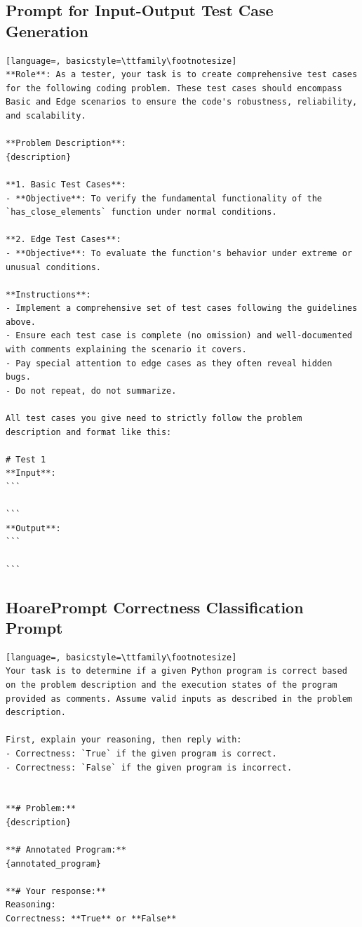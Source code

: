 \documentclass[sigconf]{acmart}
\begin{document}
\subsection{Prompt for Input-Output Test Case Generation}
\begin{tcolorbox}[ colback=gray!10, colframe=black, arc=5pt]
\begin{lstlisting}[language=, basicstyle=\ttfamily\footnotesize]
**Role**: As a tester, your task is to create comprehensive test cases for the following coding problem. These test cases should encompass Basic and Edge scenarios to ensure the code's robustness, reliability, and scalability.

**Problem Description**:  
{description}

**1. Basic Test Cases**:  
- **Objective**: To verify the fundamental functionality of the `has_close_elements` function under normal conditions.

**2. Edge Test Cases**:  
- **Objective**: To evaluate the function's behavior under extreme or unusual conditions.

**Instructions**:  
- Implement a comprehensive set of test cases following the guidelines above.  
- Ensure each test case is complete (no omission) and well-documented with comments explaining the scenario it covers.  
- Pay special attention to edge cases as they often reveal hidden bugs.  
- Do not repeat, do not summarize.  

All test cases you give need to strictly follow the problem description and format like this:

# Test 1  
**Input**:  
```

```
**Output**:  
```

```

\end{lstlisting}
\end{tcolorbox}

\subsection{HoarePrompt Correctness Classification Prompt}
\label{correctness-single-func-prompt}
\begin{tcolorbox}[ colback=gray!10, colframe=black, arc=5pt]
\begin{lstlisting}[language=, basicstyle=\ttfamily\footnotesize]
Your task is to determine if a given Python program is correct based on the problem description and the execution states of the program provided as comments. Assume valid inputs as described in the problem description.

First, explain your reasoning, then reply with:  
- Correctness: `True` if the given program is correct.  
- Correctness: `False` if the given program is incorrect.


**# Problem:**  
{description}

**# Annotated Program:**  
{annotated_program}

**# Your response:**  
Reasoning:  
Correctness: **True** or **False**

\end{lstlisting}
\end{tcolorbox}
\end{document}

